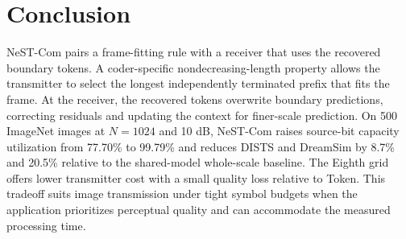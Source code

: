\section{Conclusion}
NeST-Com pairs a frame-fitting rule with a receiver that uses the recovered boundary tokens. A coder-specific nondecreasing-length property allows the transmitter to select the longest independently terminated prefix that fits the frame. At the receiver, the recovered tokens overwrite boundary predictions, correcting residuals and updating the context for finer-scale prediction. On 500 ImageNet images at $N=1024$ and 10 dB, NeST-Com raises source-bit capacity utilization from 77.70\% to 99.79\% and reduces DISTS and DreamSim by 8.7\% and 20.5\% relative to the shared-model whole-scale baseline. The Eighth grid offers lower transmitter cost with a small quality loss relative to Token. This tradeoff suits image transmission under tight symbol budgets when the application prioritizes perceptual quality and can accommodate the measured processing time.
